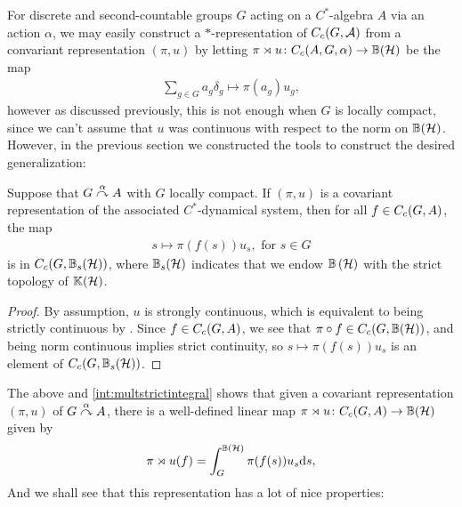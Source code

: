 For discrete and second-countable groups $G$ acting on a $C^*$-algebra $A$ via an action $\alpha$, we may easily construct a $*$-representation of $C_c(G,\mathcal{A})$ from a convariant representation $(\pi,u)$ by letting $\pi \rtimes u \colon C_c(A,G,\alpha) \to \mathbb{B}(\mathcal{H})$ be the map
\begin{align*}
	\sum_{g \in G} a_g \delta_g \mapsto \pi(a_g) u_g,
\end{align*}
however as discussed previously, this is not enough when $G$ is locally compact, since we can't assume that $u$ was continuous with respect to the norm on $\mathbb{B}(\mathcal{H})$. However, in the previous section we constructed the tools to construct the desired generalization:
\begin{lemma}
	Suppose that $G \stackrel{\alpha}{\curvearrowright} A$ with $G$ locally compact. If $(\pi,u)$ is a covariant representation of the associated $C^*$-dynamical system, then for all $f \in C_c(G,A)$, the map
	\begin{align*}
		s \mapsto \pi(f(s)) u_s, \text{ for }s \in G
	\end{align*}
	is in $C_c(G,\mathbb{B}_s(\mathcal{H}))$, where $\mathbb{B}_s(\mathcal{H})$ indicates that we endow $\mathbb{B}\left(\mathcal{H} \right)$ with the strict topology of $ \mathbb{K}(\mathcal{H})$.
	\label{cross:integrandcont}
\end{lemma}
\begin{proof}
	By assumption, $u$ is strongly continuous, which is equivalent to being strictly continuous by . Since $f \in C_c(G,A)$, we see that $\pi \circ f \in C_c(G,\mathbb{B}(\mathcal{H}))$, and being norm continuous implies strict continuity, so $s \mapsto \pi(f(s)) u_s$ is an element of $C_c(G,\mathbb{B}_s(\mathcal{H}))$.
\end{proof}
The above and \ref{int:multstrictintegral} shows that given a covariant representation $(\pi,u)$ of $G \stackrel{\alpha}{\curvearrowright} A$, there is a well-defined linear map $\pi \rtimes u \colon C_c(G,A) \to \mathbb{B}(\mathcal{H})$ given by
\begin{align*}
	\pi \rtimes u (f) = \int_G^{\mathbb{B}(\mathcal{H})} \pi(f(s)) u_s \mathrm{d} s,
\end{align*}
And we shall see that this representation has a lot of nice properties:

